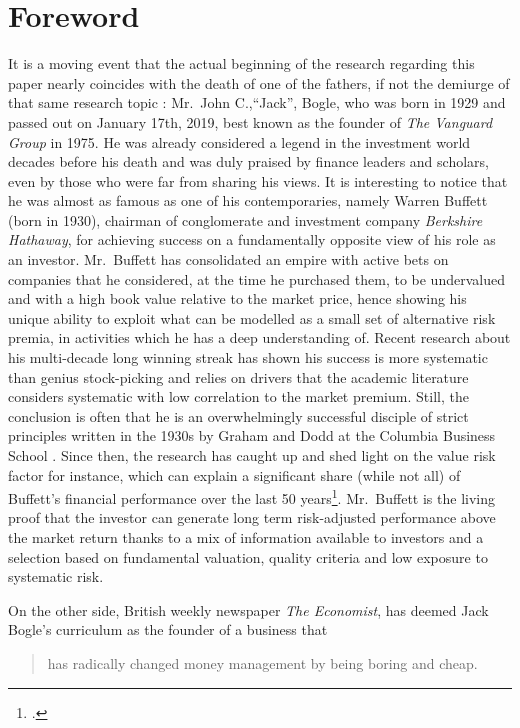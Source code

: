 \section*{Foreword}
\label{Foreword}
It is a moving event that the actual beginning of the research regarding this paper nearly coincides with the death of one of the fathers, if not the demiurge of that same research topic : Mr.~John C.,``Jack'', Bogle, who was born in 1929 and passed out on January 17th, 2019, best known as the founder of \textit{The Vanguard Group} in 1975. He was already considered a legend in the investment world decades before his death and was duly praised by finance leaders and scholars, even by those who were far from sharing his views. It is interesting to notice that he was almost as famous as one of his contemporaries, namely Warren Buffett (born in 1930), chairman of conglomerate and investment company \textit{Berkshire Hathaway}, for achieving success on a fundamentally opposite view of his role as an investor. Mr.~Buffett has consolidated an empire with active bets on companies that he considered, at the time he purchased them, to be undervalued and with a high book value relative to the market price, hence showing his unique ability to exploit what can be modelled as a small set of alternative risk premia, in activities which he has a deep understanding of. Recent research about his multi-decade long winning streak has shown his success is more systematic than genius stock-picking and relies on drivers that the academic literature considers systematic with low correlation to the market premium. Still, the conclusion is often that he is an overwhelmingly successful disciple of strict principles written in the 1930s by Graham and Dodd at the Columbia Business School \parencite{Graham1962}. Since then, the research has caught up and shed light on the value risk factor for instance, which can explain a significant share (while not all) of Buffett's financial performance over the last 50 years\footcite{Frazzini2018}. Mr.~Buffett is the living proof that the investor can generate long term risk-adjusted performance above the market return thanks to a mix of information available to investors and a selection based on fundamental valuation, quality criteria and low exposure to systematic risk.

On the other side, British weekly newspaper \textit{The Economist}, has deemed Jack Bogle's curriculum as the founder of a business that
\begin{quotation}
has radically changed money management by being boring and cheap.
\end{quotation}

